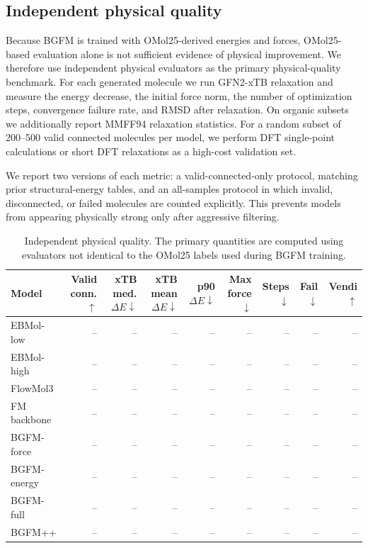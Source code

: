 \subsection{Independent physical quality}

Because BGFM is trained with OMol25-derived energies and forces, OMol25-based evaluation alone is not sufficient evidence of physical improvement. We therefore use independent physical evaluators as the primary physical-quality benchmark. For each generated molecule we run GFN2-xTB relaxation and measure the energy decrease, the initial force norm, the number of optimization steps, convergence failure rate, and RMSD after relaxation. On organic subsets we additionally report MMFF94 relaxation statistics. For a random subset of 200--500 valid connected molecules per model, we perform DFT single-point calculations or short DFT relaxations as a high-cost validation set.

We report two versions of each metric: a valid-connected-only protocol, matching prior structural-energy tables, and an all-samples protocol in which invalid, disconnected, or failed molecules are counted explicitly. This prevents models from appearing physically strong only after aggressive filtering.

\begin{table}[t]
\centering
\small
\caption{Independent physical quality. The primary quantities are computed using evaluators not identical to the OMol25 labels used during BGFM training.}
\label{tab:independent_physics}
\begin{tabular}{lrrrrrrrr}
\toprule
Model & Valid conn.$\uparrow$ & xTB med. $\Delta E\downarrow$ & xTB mean $\Delta E\downarrow$ & p90 $\Delta E\downarrow$ & Max force$\downarrow$ & Steps$\downarrow$ & Fail$\downarrow$ & Vendi$\uparrow$ \\
\midrule
EBMol-low & -- & -- & -- & -- & -- & -- & -- & -- \\
EBMol-high & -- & -- & -- & -- & -- & -- & -- & -- \\
FlowMol3 & -- & -- & -- & -- & -- & -- & -- & -- \\
FM backbone & -- & -- & -- & -- & -- & -- & -- & -- \\
BGFM-force & -- & -- & -- & -- & -- & -- & -- & -- \\
BGFM-energy & -- & -- & -- & -- & -- & -- & -- & -- \\
BGFM-full & -- & -- & -- & -- & -- & -- & -- & -- \\
BGFM++ & -- & -- & -- & -- & -- & -- & -- & -- \\
\bottomrule
\end{tabular}
\end{table}

